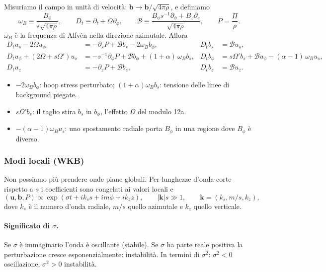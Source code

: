 Misuriamo il campo in unità di velocità: $\mathbf{b}\to\mathbf{b}/\sqrt{4\pi\rho}$, e definiamo
\begin{equation}
\omega_B\equiv\frac{B_\phi}{s\sqrt{4\pi\rho}},\qquad D_t\equiv\partial_t+\Omega\partial_\phi,\qquad
\mathcal{B}\equiv\frac{B_\phi s^{-1}\partial_\phi+B_z\partial_z}{\sqrt{4\pi\rho}},\qquad P=\frac{\Pi}{\rho}.
\end{equation}
$\omega_B$ è la frequenza di Alfvén nella direzione azimutale. Allora
\begin{align}
D_tu_s-2\Omega u_\phi&=-\partial_sP+\mathcal{B}b_s-2\omega_Bb_\phi, & D_tb_s&=\mathcal{B}u_s,\\
D_tu_\phi+(2\Omega+s\Omega')u_s&=-s^{-1}\partial_\phi P+\mathcal{B}b_\phi+(1+\alpha)\,\omega_Bb_s, & D_tb_\phi&=s\Omega'b_s+\mathcal{B}u_\phi-(\alpha-1)\,\omega_Bu_s,\\
D_tu_z&=-\partial_zP+\mathcal{B}b_z, & D_tb_z&=\mathcal{B}u_z.
\end{align}
\begin{itemize}
\item $-2\omega_Bb_\phi$: hoop stress perturbato; $(1+\alpha)\omega_Bb_s$: tensione delle linee di background piegate.
\item $s\Omega'b_s$: il taglio stira $b_s$ in $b_\phi$, l'effetto $\Omega$ del modulo 12a.
\item $-(\alpha-1)\omega_Bu_s$: uno spostamento radiale porta $B_\phi$ in una regione dove $B_\phi$ è diverso.
\end{itemize}

\subsubsection{Modi locali (WKB)}

Non possiamo più prendere onde piane globali. Per lunghezze d'onda corte rispetto a $s$ i coefficienti sono congelati ai valori locali e
\begin{equation}
(\mathbf{u},\mathbf{b},P)\propto\exp(\sigma t+ik_ss+im\phi+ik_zz),\qquad|\mathbf{k}|s\gg1,\qquad\mathbf{k}=(k_s,m/s,k_z),
\end{equation}
dove $k_s$ è il numero d'onda radiale, $m/s$ quello azimutale e $k_z$ quello verticale.

\paragraph{Significato di $\sigma$.} Se $\sigma$ è immaginario l'onda è oscillante (stabile). Se $\sigma$ ha parte reale positiva la perturbazione cresce esponenzialmente: instabilità. In termini di $\sigma^2$: $\sigma^2<0$ oscillazione, $\sigma^2>0$ instabilità.

